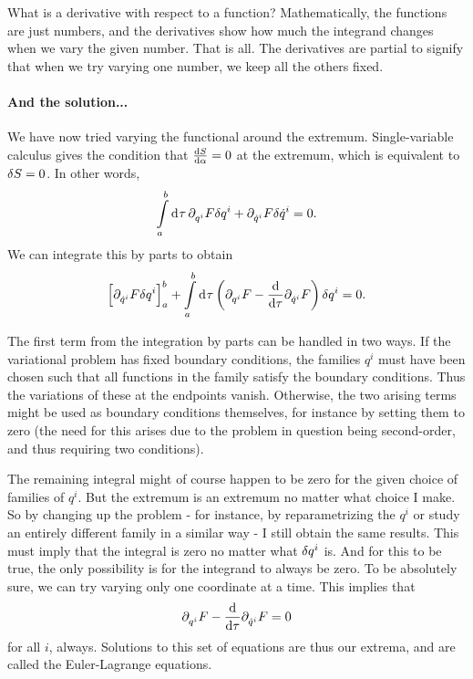 What is a derivative with respect to a function? Mathematically, the functions are just numbers, and the derivatives show how much the integrand changes when we vary the given number. That is all. The derivatives are partial to signify that when we try varying one number, we keep all the others fixed.

\paragraph{And the solution...}
We have now tried varying the functional around the extremum. Single-variable calculus gives the condition that $\dv{S}{\alpha} = 0$ at the extremum, which is equivalent to $\delta S = 0$. In other words,
\begin{align*}
	\int\limits_{a}^{b}\dd[]{\tau}\partial^{}_{q^{i}}F\delta q^{i} + \partial^{}_{\dot{q}^{i}}F\delta \dot{q}^{i} = 0.
\end{align*}
We can integrate this by parts to obtain
\begin{align*}
	\left[\partial^{}_{\dot{q}^{i}}F\delta q^{i}\right]_{a}^{b} + \int\limits_{a}^{b}\dd[]{\tau}\left(\partial^{}_{q^{i}}F - \dv{\tau}\partial^{}_{\dot{q}^{i}}F\right)\delta q^{i} = 0.
\end{align*}

The first term from the integration by parts can be handled in two ways. If the variational problem has fixed boundary conditions, the families $q^{i}$ must have been chosen such that all functions in the family satisfy the boundary conditions. Thus the variations of these at the endpoints vanish. Otherwise, the two arising terms might be used as boundary conditions themselves, for instance by setting them to zero (the need for this arises due to the problem in question being second-order, and thus requiring two conditions).

The remaining integral might of course happen to be zero for the given choice of families of $q^{i}$. But the extremum is an extremum no matter what choice I make. So by changing up the problem - for instance, by reparametrizing the $q^{i}$ or study an entirely different family in a similar way - I still obtain the same results. This must imply that the integral is zero no matter what $\delta q^{i}$ is. And for this to be true, the only possibility is for the integrand to always be zero. To be absolutely sure, we can try varying only one coordinate at a time. This implies that
\begin{align*}
	\partial^{}_{q^{i}}F - \dv{\tau}\partial^{}_{\dot{q}^{i}}F = 0
\end{align*}
for all $i$, always. Solutions to this set of equations are thus our extrema, and are called the Euler-Lagrange equations.

